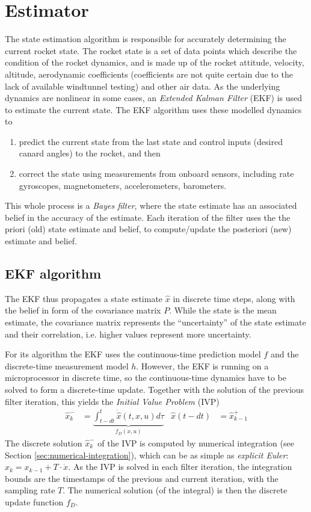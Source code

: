 \section{Estimator} \label{sec:estimator}
The state estimation algorithm is responsible for accurately determining the current rocket state.
The rocket state is a set of data points which describe the condition of the rocket dynamics, and is made up of the rocket attitude, velocity, altitude, aerodynamic coefficients (coefficients are not quite certain due to the lack of available windtunnel testing) and other air data.
As the underlying dynamics are nonlinear in some cases, an \textit{Extended Kalman Filter} (EKF) is used to estimate the current state. The EKF algorithm uses these modelled dynamics to
\begin{enumerate}
    \item predict the current state from the last state and control inputs (desired canard angles) to the rocket, and then
    \item correct the state using measurements from onboard sensors, including rate gyroscopes, magnetometers, accelerometers, barometers.
\end{enumerate}
This whole process is a \textit{Bayes filter}, where the state estimate has an associated belief in the accuracy of the estimate.
Each iteration of the filter uses the the priori (old) state estimate and belief, to compute/update the posteriori (new) estimate and belief.

\subsection{EKF algorithm}
The EKF thus propagates a state estimate $\hat x$ in discrete time steps, along with the belief in form of the covariance matrix $P$.
While the state is the mean estimate, the covariance matrix represents the ``uncertainty'' of the state estimate and their correlation, i.e. higher values represent more uncertainty. 

For its algorithm the EKF uses the continuous-time prediction model $f$ and the discrete-time measurement model $h$.
However, the EKF is running on a microprocessor in discrete time, so the continuous-time dynamics have to be solved to form a discrete-time update. 
Together with the solution of the previous filter iteration, this yields the \textit{Initial Value Problem} (IVP) 
\begin{align}
     \hat x_k^- &= \underbrace{\int_{t-dt}^{t} \dot{\hat x}(t,x,u) d\tau}_{f_D(x,u)}
     &
     \hat x (t-dt) &= \hat x_{k-1}^+
     \label{eq:estimator-ivp}
\end{align}
The discrete solution $\hat x_k^-$ of the IVP is computed by numerical integration (see Section \ref{sec:numerical-integration}), which can be as simple as \textit{explicit Euler}: $x_k = x_{k-1} + T \cdot \dot x$.
As the IVP is solved in each filter iteration, the integration bounds are the timestamps of the previous and current iteration, with the sampling rate $T$.
The numerical solution (of the integral) is then the discrete update function $f_D$.

